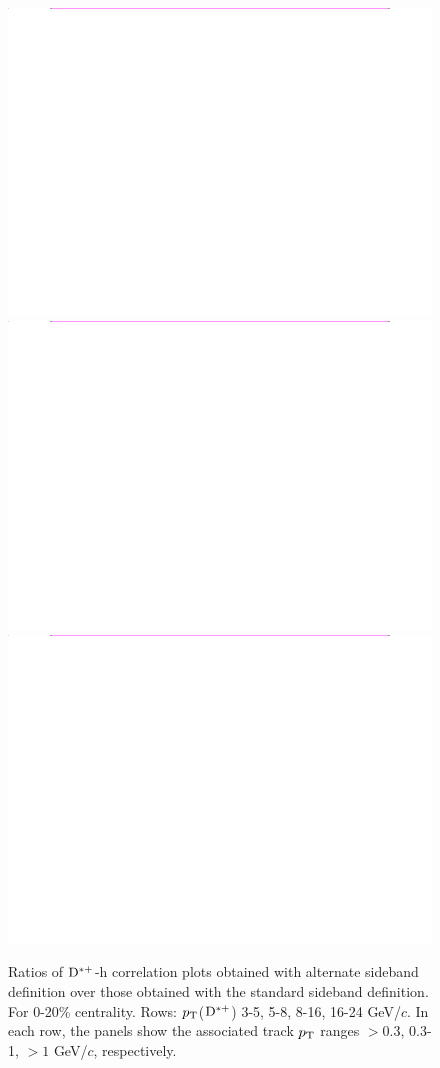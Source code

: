 \begin{figure}
{\includegraphics[width=0.31\linewidth]{figuresVsCent/Dstar/SystSideb/0_20/Ratio_AzimCorrDistr_Dstar_Canvas_PtIntBins10to10_PoolInt_thr03to99_Sideband_020.png}}
{\includegraphics[width=0.31\linewidth]{figuresVsCent/Dstar/SystSideb/0_20/Ratio_AzimCorrDistr_Dstar_Canvas_PtIntBins10to10_PoolInt_thr03to1_Sideband_020.png}}
{\includegraphics[width=0.31\linewidth]{figuresVsCent/Dstar/SystSideb/0_20/Ratio_AzimCorrDistr_Dstar_Canvas_PtIntBins10to10_PoolInt_thr1to99_Sideband_020.png}} \\

 \caption{Ratios of ${\rm D^{*+}}$-h correlation plots obtained with alternate sideband definition over those obtained with the standard sideband definition. For 0-20\% centrality. Rows: $p_{\rm T}$(${\rm D^{*+}}$) 3-5, 5-8, 8-16, 16-24 GeV/$c$. In each row, the panels show the associated track
$p_{\rm T}$ ranges $> 0.3$, 0.3-1, $> 1$ GeV/$c$, respectively.}
\label{fig:SysBkg020_Dstar}
\end{figure}




